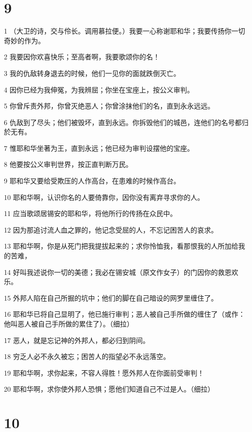 \chapter{9}

\par 1 （大卫的诗，交与伶长。调用慕拉便。）我要一心称谢耶和华；我要传扬你一切奇妙的作为。
\par 2 我要因你欢喜快乐；至高者啊，我要歌颂你的名！
\par 3 我的仇敌转身退去的时候，他们一见你的面就跌倒灭亡。
\par 4 因你已经为我伸冤，为我辨屈；你坐在宝座上，按公义审判。
\par 5 你曾斥责外邦，你曾灭绝恶人；你曾涂抹他们的名，直到永永远远。
\par 6 仇敌到了尽头；他们被毁坏，直到永远。你拆毁他们的城邑，连他们的名号都归於无有。
\par 7 惟耶和华坐著为王，直到永远；他已经为审判设摆他的宝座。
\par 8 他要按公义审判世界，按正直判断万民。
\par 9 耶和华又要给受欺压的人作高台，在患难的时候作高台。
\par 10 耶和华啊，认识你名的人要倚靠你，因你没有离弃寻求你的人。
\par 11 应当歌颂居锡安的耶和华，将他所行的传扬在众民中。
\par 12 因为那追讨流人血之罪的，他记念受屈的人，不忘记困苦人的哀求。
\par 13 耶和华啊，你是从死门把我提拔起来的；求你怜恤我，看那恨我的人所加给我的苦难，
\par 14 好叫我述说你一切的美德；我必在锡安城（原文作女子）的门因你的救恩欢乐。
\par 15 外邦人陷在自己所掘的坑中；他们的脚在自己暗设的网罗里缠住了。
\par 16 耶和华已将自己显明了，他已施行审判；恶人被自己手所做的缠住了（或作：他叫恶人被自己手所做的累住了）。（细拉）
\par 17 恶人，就是忘记神的外邦人，都必归到阴间。
\par 18 穷乏人必不永久被忘；困苦人的指望必不永远落空。
\par 19 耶和华啊，求你起来，不容人得胜！愿外邦人在你面前受审判！
\par 20 耶和华啊，求你使外邦人恐惧；愿他们知道自己不过是人。（细拉）

\chapter{10}

